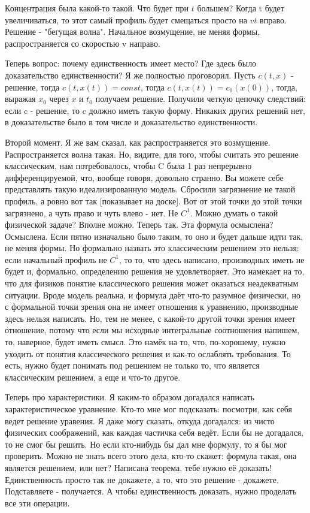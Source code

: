 Концентрация была какой-то такой. Что будет при $t$ большем? Когда t будет увеличиваться, то этот самый профиль будет смещаться просто на $vt$ вправо. Решение - "бегущая волна". Начальное возмущение, не меняя формы, распространяется со скоростью v направо.

Теперь вопрос: почему единственность имеет место? Где здесь было доказательство единственности? Я же полностью проговорил. Пусть $c(t,x)$ - решение, тогда $c(t,x(t)) = const$, тогда $c(t,x(t)) = c_0(x(0))$, тогда, выражая $x_0$ через $x$ и $t_0$ получаем решение. Получили четкую цепочку следствий: если c - решение, то c должно иметь такую форму. Никаких других решений нет, в доказательстве было в том числе и доказательство единственности.

Второй момент. Я же вам сказал, как распространяется это возмущение. Распространяется волна такая. Но, видите, для того, чтобы считать это решение классическим, нам потребовалось, чтобы C была 1 раз непрерывно дифференцируемой, что, вообще говоря, довольно странно. Вы можете себе представлять такую идеализированную модель. Сбросили загрязнение не такой профиль, а ровно вот так [показывает на доске]. Вот от этой точки до этой точки загрязнено, а чуть право и чуть влево - нет. Не $C^1$. Можно думать о такой физической задаче? Вполне можно. Теперь так. Эта формула осмыслена? Осмыслена. Если пятно изначально было таким, то оно и будет дальше идти так, не меняя формы. Но формально назвать это классическим решением это нельзя: если начальный профиль не $C^1$, то то, что здесь написано, производных иметь не будет и, формально, определению решения не удовлетворяет. Это намекает на то, что для физиков понятие классического решения может оказаться неадекватным ситуации. Вроде модель реальна, и формула даёт что-то разумное физически, но с формальной точки зрения она не имеет отношения к уравнению, производные здесь нельзя написать. Но, тем не менее, с какой-то другой точки зрения имеет отношение, потому что если мы исходные интегральные соотношения напишем, то, наверное, будет иметь смысл. Это намёк на то, что, по-хорошему, нужно уходить от понятия классического решения и как-то ослаблять требования. То есть, нужно будет понимать под решением не только то, что является классическим решением, а еще и что-то другое.

Теперь про характеристики. Я каким-то образом догадался написать характеристическое уравнение. Кто-то мне мог подсказать: посмотри, как себя ведет решение уравения. Я даже могу сказать, откуда догадался: из чисто физических соображений, как каждая частичка себя ведёт. Если бы не догадался, то не смог бы решить. Но если кто-нибудь бы дал мне формулу, то я бы мог проверить. Можно не знать всего этого дела, кто-то скажет: формула такая, она является решением, или нет? Написана теорема, тебе нужно её доказать! Единственность просто так не докажете, а то, что это решение - докажете. Подставляете - получается. А чтобы единственность доказать, нужно проделать все эти операции.

